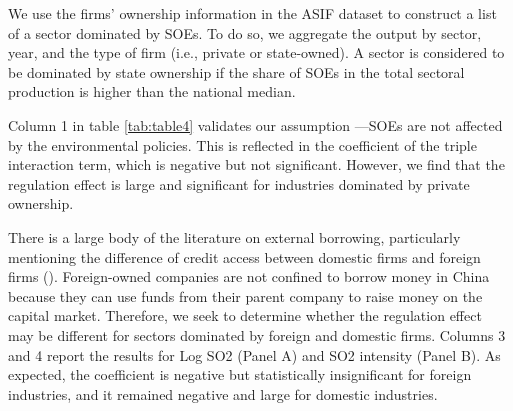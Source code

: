 \documentclass[12pt]{article}
\begin{document}
We use the firms’ ownership information in the ASIF dataset to construct a list of a sector dominated by SOEs. To do so, we aggregate the output by sector, year, and the type of firm (i.e., private or state-owned). A sector is considered to be dominated by state ownership if the share of SOEs in the total sectoral production is higher than the national median.

Column 1 in table \ref{tab:table4} validates our assumption —SOEs are not affected by the environmental policies. This is reflected in the coefficient of the triple interaction term, which is negative but not significant. However, we find that the regulation effect is large and significant for industries dominated by private ownership.

There is a large body of the literature on external borrowing, particularly mentioning the difference of credit access between domestic firms and foreign firms (\cite{Poncet2010-vv, Jarreau2014-lb, Manova2015-zk}). Foreign-owned companies are not confined to borrow money in China because they can use funds from their parent company to raise money on the capital market. Therefore, we seek to determine whether the regulation effect may be different for sectors dominated by foreign and domestic firms. Columns 3 and 4 report the results for Log SO2 (Panel A) and SO2 intensity (Panel B). As expected, the coefficient is negative but statistically insignificant for foreign industries, and it remained negative and large for domestic industries. 
\end{document}
